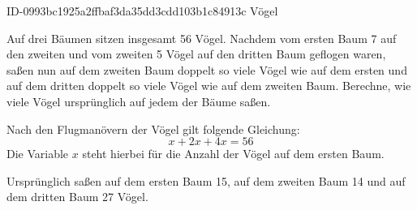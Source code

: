 \begin{exercise}
      {ID-0993bc1925a2ffbaf3da35dd3cdd103b1c84913c}
      {Vögel}
  \ifproblem\problem\par
    Auf drei Bäumen sitzen insgesamt \num{56} Vögel. Nachdem vom ersten Baum \num{7} auf
    den zweiten und vom zweiten \num{5} Vögel auf den dritten Baum geflogen waren,
    saßen nun auf dem zweiten Baum doppelt so viele Vögel wie auf dem ersten
    und auf dem dritten doppelt so viele Vögel wie auf dem zweiten Baum.
    Berechne, wie viele Vögel ursprünglich auf jedem der Bäume saßen.
  \fi
  \ifoutline\outline\par
    Nach den \glqq Flugmanövern\grqq{} der Vögel gilt folgende Gleichung:
    \begin{equation*}
      x+2x+4x=\num{56}
    \end{equation*}
    Die Variable $x$ steht hierbei für die Anzahl der Vögel auf dem ersten Baum.
  \fi
  \ifoutcome\outcome\par
    Ursprünglich saßen auf dem ersten Baum \num{15},
    auf dem zweiten Baum \num{14} und
    auf dem dritten Baum \num{27} Vögel.
  \fi
\end{exercise}
